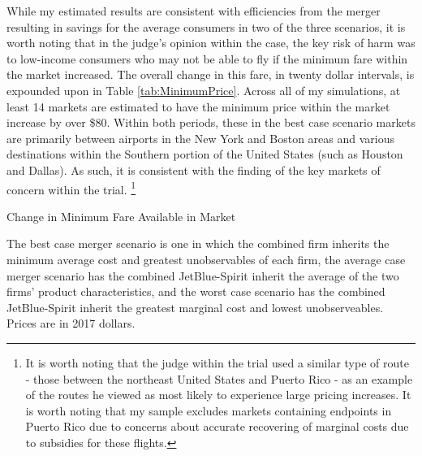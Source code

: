 \documentclass{article}
\begin{document}
    While my estimated results are consistent with efficiencies from the merger resulting in savings for the average consumers in two of the three scenarios, it is worth noting that in the judge's opinion within the case, the key risk of harm was to low-income consumers who may not be able to fly if the minimum fare within the market increased. The overall change in this fare, in twenty dollar intervals, is expounded upon in Table \ref{tab:MinimumPrice}. Across all of my simulations, at least 14 markets are estimated to have the minimum price within the market increase by over \$80. Within both periods, these in the best case scenario markets are primarily between airports in the New York and Boston areas and various destinations within the Southern portion of the United States (such as Houston and Dallas). As such, it is consistent with the finding of the key markets of concern within the trial. \footnote{It is worth noting that the judge within the trial used a similar type of route - those between the northeast United States and Puerto Rico - as an example of the routes he viewed as most likely to experience large pricing increases. It is worth noting that my sample excludes markets containing endpoints in Puerto Rico due to concerns about accurate recovering of marginal costs due to subsidies for these flights.} 

    \begin{table}
        \caption{Change in Minimum Fare Available in Market}
        \label{tab:MinimumPrice}
                \vspace{-15mm}
        \begin{center}
            
        \end{center}
        \footnotesize{The best case merger scenario is one in which the combined firm inherits the minimum average cost and greatest unobservables of each firm, the average case merger scenario has the combined JetBlue-Spirit inherit the average of the two firms' product characteristics, and the worst case scenario has the combined JetBlue-Spirit inherit the greatest marginal cost and lowest unobserveables. Prices are in 2017 dollars.}
    \end{table}    
\end{document}
